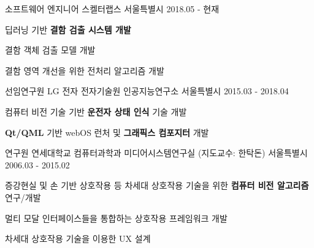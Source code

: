 


\begin{cventries}

  \cventry
    {소프트웨어 엔지니어} %
    {스켈터랩스} %
    {서울특별시} %
    {2018.05 - 현재} %
    {
      \begin{cvitems} %
        \item {딥러닝 기반 \textbf{결함 검출 시스템 개발}}
        \item {결함 객체 검출 모델 개발}
        \item {결함 영역 개선을 위한 전처리 알고리즘 개발}
      \end{cvitems}
    }

  \cventry
    {선임연구원} %
    {LG 전자 전자기술원 인공지능연구소} %
    {서울특별시} %
    {2015.03 - 2018.04} %
    {
      \begin{cvitems} %
        \item {컴퓨터 비전 기술 기반 \textbf{운전자 상태 인식} 기술 개발}
        \item {\textbf{Qt/QML} 기반 webOS 런처 및 \textbf{그래픽스 컴포지터} 개발}
      \end{cvitems}
    }


  \cventry
    {연구원} %
    {연세대학교 컴퓨터과학과 미디어시스템연구실 (지도교수: 한탁돈)} %
    {서울특별시} %
    {2006.03 - 2015.02} %
    {
      \begin{cvitems} %
        \item {증강현실 및 손 기반 상호작용 등 차세대 상호작용 기술을 위한 \textbf{컴퓨터 비전 알고리즘} 연구/개발}
        \item {멀티 모달 인터페이스들을 통합하는 상호작용 프레임워크 개발}
        \item {차세대 상호작용 기술을 이용한 UX 설계}
      \end{cvitems}
    }

\end{cventries}
